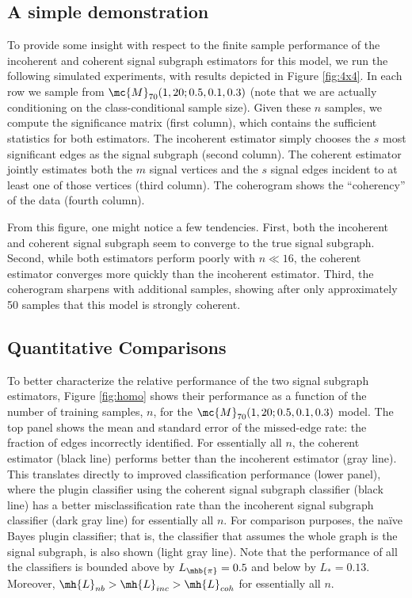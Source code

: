 \documentclass[10pt,journal,cspaper,compsoc]{IEEEtran}
\begin{document}
\subsection{A simple demonstration} %
\label{sub:a_simple_demonstration}
  

To provide some insight with respect to the finite sample performance of the incoherent and coherent signal subgraph estimators for this model, we run the following simulated experiments, with results depicted in  Figure \ref{fig:4x4}.  In each row we sample from $\mc{M}_{70}(1,20;0.5,0.1,0.3)$  (note that we are actually conditioning on the class-conditional sample size).  Given these $n$ samples, we compute the significance matrix (first column), which contains the sufficient statistics for both estimators.  The incoherent estimator simply chooses the $s$ most significant edges as the signal subgraph (second column). The coherent estimator jointly estimates both the $m$ signal vertices and the $s$ signal edges incident to at least one of those vertices (third column).  The coherogram shows the ``coherency'' of the data (fourth column).    

From this figure, one might notice a few tendencies.  First, both the incoherent and coherent signal subgraph seem to converge to the true signal subgraph.  Second, while 
both estimators perform poorly with $n\ll 16$, 
the coherent estimator converges more quickly than the incoherent estimator.  Third, the coherogram sharpens with additional samples,  showing after only approximately 50 samples that this model is strongly coherent.


\subsection{Quantitative Comparisons} %
\label{sub:relative_efficiencies}


To better characterize the relative performance of the two signal subgraph estimators, Figure \ref{fig:homo} shows their performance as a function of the number of training samples, $n$, for the $\mc{M}_{70}(1,20;0.5,0.1,0.3)$ model.  The top panel shows the mean and standard error of the missed-edge rate: the fraction of edges incorrectly identified.  For essentially all $n$, the coherent estimator (black line) performs better than the incoherent estimator (gray line).  This translates directly to improved classification performance (lower panel), where the plugin classifier using the coherent signal subgraph classifier (black line) has a better misclassification rate than the incoherent signal subgraph classifier (dark gray line) for essentially all $n$.  For comparison purposes, the na\"ive Bayes plugin classifier; that is, the classifier that assumes the whole graph is the signal subgraph, is also shown (light gray line).  Note that the performance of all the classifiers is bounded above by $L_{\mhb{\pi}} = 0.5$ and below by $L_* = 0.13$.  Moreover,  $\mh{L}_{nb} > \mh{L}_{inc} > \mh{L}_{coh}$ for essentially all $n$.
\end{document}
